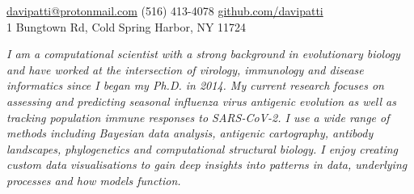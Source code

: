 \documentclass[10pt,a4paper]{article}
\begin{document}
\sloppy  %


\nobreakvspace{0.3em}  %

\noindent\href{mailto:davipatti@protonmail.com}{davipatti\mbox{}@\mbox{}protonmail.com}\sbull
{} (516) 413-4078\sbull
\href{https://github.com/davipatti}{github.com/davipatti}
\\
1 Bungtown Rd, Cold Spring Harbor, NY 11724

\spacedhrule{0.5em}{-0.4em}  %


\begin{multicols}{2}
  \noindent \emph{I am a computational scientist with a strong background in evolutionary
  biology and have worked at the intersection of virology, immunology and disease
  informatics since I began my Ph.D. in 2014. My current research focuses on assessing
  and predicting seasonal influenza virus antigenic evolution as well as tracking
  population immune responses to SARS-CoV-2. I use a wide range of methods including
  Bayesian data analysis, antigenic cartography, antibody landscapes, phylogenetics and
  computational structural biology. I enjoy creating custom data visualisations to gain
  deep insights into patterns in data, underlying processes and how models function.}
\end{multicols}

\spacedhrule{0.9em}{-0.4em}

\end{document}
